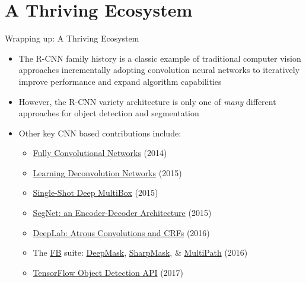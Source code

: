 \documentclass[handout]{beamer}
\begin{document}
\section{A Thriving Ecosystem}
\begin{frame}{Wrapping up: A Thriving Ecosystem}
\begin{itemize}
\itemsep 1em
	\item<1->The R-CNN family history is a classic example of traditional computer vision approaches incrementally adopting convolution neural networks to iteratively improve performance and expand algorithm capabilities 
	\item<2->However, the R-CNN variety architecture is only one of \emph{many} different approaches for object detection and segmentation
	\item<3->Other key CNN based contributions include:
	\begin{itemize}[square]
		\item<1>\href{https://arxiv.org/abs/1411.4038}{\color{blue}Fully Convolutional Networks} (2014)  
		\item<2>\href{https://arxiv.org/abs/1505.04366}{\color{blue}Learning Deconvolution Networks} (2015)
		\item<3>\href{https://arxiv.org/abs/1512.02325}{\color{blue}Single-Shot Deep MultiBox} (2015)
		\item<4>\href{https://arxiv.org/abs/1511.00561}{\color{blue}SegNet: an Encoder-Decoder Architecture} (2015)
		\item<5>\href{https://arxiv.org/abs/1606.00915}{\color{blue}DeepLab: Atrous Convolutions and CRFs} (2016)
		\item<6>The \href{https://research.fb.com/category/facebook-ai-research-fair/}{\color{blue}FB} suite: \href{https://arxiv.org/abs/1506.06204}{\color{blue}DeepMask}, \href{https://arxiv.org/abs/1603.08695}{\color{blue}SharpMask}, \& \href{https://arxiv.org/abs/1604.02135}{\color{blue}MultiPath} (2016)
		\item<7>\href{https://github.com/tensorflow/models/tree/master/object_detection}{\color{blue}TensorFlow Object Detection API} (2017)
	\end{itemize}
\end{itemize}
\end{frame}
\end{document}
